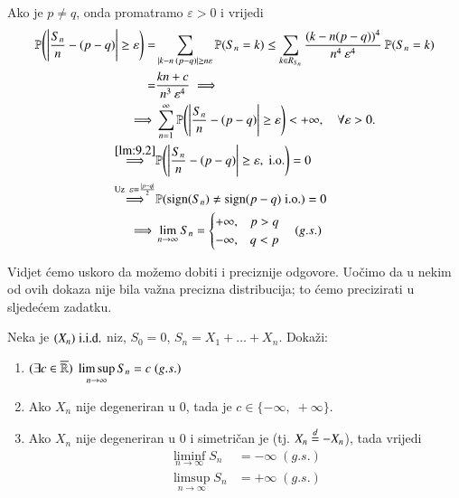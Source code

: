 \begin{pr}
    Ako je $p \neq q$, onda promatramo $\varepsilon > 0$ i vrijedi
    \begin{equation*}
        \begin{aligned}
            \mathbb{P} \Bigg( \Bigg|\frac{S_n}{n} - (p - q) \Bigg| \geq \varepsilon \Bigg) =& \sum\limits_{|k - n \: (p-q)| \geq n \varepsilon}^{} \mathbb{P}({S_n = k}) \leq \sum\limits_{k \in R_{S_n}}^{} \frac{(k - n(p-q))^4}{n^4 \: \varepsilon^4} \: \mathbb{P}({S_n = k})\\
            =& \frac{k n + c}{n^3 \: \varepsilon^4} \implies\\
            \implies & \sum\limits_{n = 1}^{\infty} \mathbb{P} \Bigg( \Bigg| \frac{S_n}{n} - (p - q) \Bigg| \geq \varepsilon \Bigg) < + \infty, \quad \forall \varepsilon > 0.\\
            \overset{\ref{lm:9.2}}{\implies} & \mathbb{P} \Bigg( \Bigg| \frac{S_n}{n} - (p - q) \Bigg| \geq \varepsilon, \; \mathrm{i.o.} \Bigg) = 0\\
            \overset{\textnormal{Uz }\; \varepsilon = \frac{|p - q|}{2}}{\implies} & \mathbb{P}({\operatorname{sign} (S_n) \neq \operatorname{sign} (p - q) \; \mathrm{i.o.}}) = 0\\
            \implies & \lim\limits_{n \to \infty} S_n
            =
            \begin{cases}
                + \infty, &p > q\\
                - \infty, &q < p
            \end{cases}
            \quad (g.s.)
        \end{aligned}
    \end{equation*}
\end{pr}

Vidjet \' cemo uskoro da mo\v zemo dobiti i preciznije odgovore.
Uo\v cimo da u nekim od ovih dokaza nije bila va\v zna precizna distribucija; to \' cemo precizirati u sljede\' cem zadatku.

\begin{zad} \label{zad:10.4}
    Neka je $(X_n) \; \mathrm{i.i.d.}$ niz, $S_0 = 0$, $S_n = X_1 + \ldots + X_n$.
    Doka\v zi:
    \begin{enumerate}[label=(\alph*)]
        \item $(\exists c \in \overline{\mathbb{R}})\; \limsup\limits_{n \to \infty} S_n = c \; (g.s.)$
        \item Ako $X_n$ nije degeneriran u $0$, tada je $c \in \{-\infty, \; +\infty\}$.
        \item Ako $X_n$ nije degeneriran u $0$ i simetri\v can je (tj. $X_n \overset{d}{=} - X_n$), tada vrijedi
        \begin{equation*}
            \begin{aligned}
                \liminf\limits_{n \to \infty} S_n &= - \infty \; (g.s.)\\
                \limsup\limits_{n \to \infty} S_n &= +\infty \; (g.s.)
            \end{aligned}
        \end{equation*}
    \end{enumerate}
\end{zad}